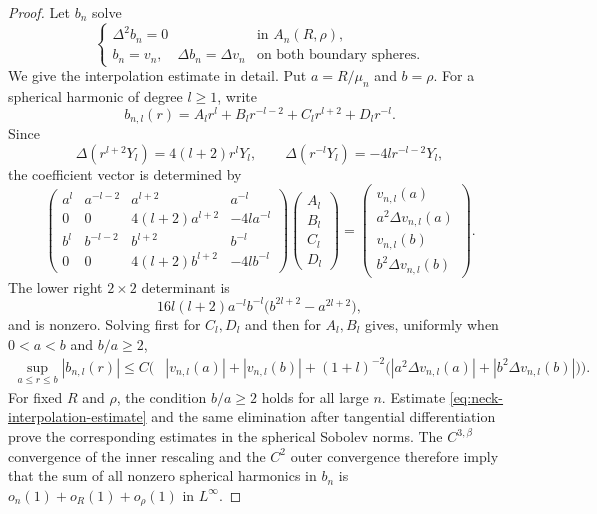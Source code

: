 \documentclass[11pt]{article}
\numberwithin{equation}{section}
\begin{document}
\begin{proof}
Let $b_n$ solve
\begin{equation*}
\begin{cases}
\Delta^2b_n=0&\text{in }A_n(R,\rho),\\
b_n=v_n,\quad \Delta b_n=\Delta v_n
&\text{on both boundary spheres}.
\end{cases}
\end{equation*}
We give the interpolation estimate in detail. Put
$a=R/\mu_n$ and $b=\rho$. For a spherical harmonic of degree
$l\geq1$, write
\[
b_{n,l}(r)=A_lr^l+B_lr^{-l-2}+C_lr^{l+2}+D_lr^{-l}.
\]
Since
\[
\Delta(r^{l+2}Y_l)=4(l+2)r^lY_l,
\qquad
\Delta(r^{-l}Y_l)=-4lr^{-l-2}Y_l,
\]
the coefficient vector is determined by
\begin{equation}\label{eq:neck-interpolation-matrix}
\begin{pmatrix}
a^l&a^{-l-2}&a^{l+2}&a^{-l}\\
0&0&4(l+2)a^{l+2}&-4la^{-l}\\
b^l&b^{-l-2}&b^{l+2}&b^{-l}\\
0&0&4(l+2)b^{l+2}&-4lb^{-l}
\end{pmatrix}
\begin{pmatrix}A_l\\B_l\\C_l\\D_l\end{pmatrix}
=
\begin{pmatrix}
v_{n,l}(a)\\a^2\Delta v_{n,l}(a)\\
v_{n,l}(b)\\b^2\Delta v_{n,l}(b)
\end{pmatrix}.
\end{equation}
The lower right $2\times2$ determinant is
\[
16l(l+2)a^{-l}b^{-l}
\bigl(b^{2l+2}-a^{2l+2}\bigr),
\]
and is nonzero. Solving first for $C_l,D_l$ and then for $A_l,B_l$
gives, uniformly when $0<a<b$ and $b/a\geq2$,
\begin{equation}\label{eq:neck-interpolation-estimate}
\begin{aligned}
\sup_{a\leq r\leq b}|b_{n,l}(r)|
\leq C\Big(&|v_{n,l}(a)|+|v_{n,l}(b)|+(1+l)^{-2}
\bigl(|a^2\Delta v_{n,l}(a)|
+|b^2\Delta v_{n,l}(b)|\bigr)\Big).
\end{aligned}
\end{equation}
For fixed $R$ and $\rho$, the condition $b/a\geq2$ holds for all
large $n$.  Estimate \eqref{eq:neck-interpolation-estimate} and the
same elimination after tangential differentiation prove the
corresponding estimates in the spherical Sobolev norms. The
$C^{3,\beta}$ convergence of the inner rescaling and the $C^2$
outer convergence therefore imply that the sum of all nonzero
spherical harmonics in $b_n$ is
$o_n(1)+o_R(1)+o_\rho(1)$ in $L^\infty$.


\end{proof}
\end{document}
